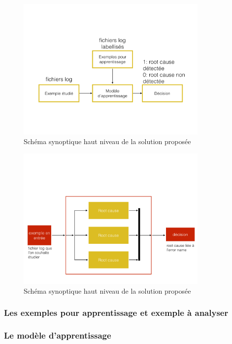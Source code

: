 \begin{figure}[h]
	\centering\includegraphics[height=7cm]{images/synoptique_root.png}
	\caption{Schéma synoptique haut niveau de la solution proposée}
	\label{fig:Schéma synoptique haut niveau de la solution proposée: couche root cause}
\end{figure}

\begin{figure}[h]
	\centering\includegraphics[height=7cm]{images/synoptique_error.png}
	\caption{Schéma synoptique haut niveau de la solution proposée}
	\label{fig:Schéma synoptique haut niveau de la solution proposée: couche error name}
\end{figure}

\subsubsection{Les exemples pour apprentissage et exemple à analyser}
\label{Automatisation du processus d'investigation: Achitecture High Level du système proposé: Les exemples d'apprentissage}

\subsubsection{Le modèle d'apprentissage}
\label{Automatisation du processus d'investigation: Achitecture High Level du système proposé: Le modèle d'apprentissage}

